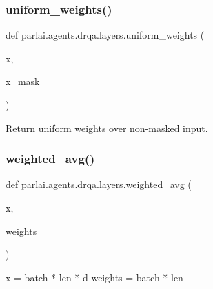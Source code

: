 \subsubsection{\texorpdfstring{uniform\+\_\+weights()}{uniform\_weights()}}
{\footnotesize\ttfamily def parlai.\+agents.\+drqa.\+layers.\+uniform\+\_\+weights (\begin{DoxyParamCaption}\item[{}]{x,  }\item[{}]{x\+\_\+mask }\end{DoxyParamCaption})}

\begin{DoxyVerb}Return uniform weights over non-masked input.
\end{DoxyVerb}
 \mbox{\label{namespaceparlai_1_1agents_1_1drqa_1_1layers_a8d0e781e00db1c2d843b21a056554f65}} 
\subsubsection{\texorpdfstring{weighted\+\_\+avg()}{weighted\_avg()}}
{\footnotesize\ttfamily def parlai.\+agents.\+drqa.\+layers.\+weighted\+\_\+avg (\begin{DoxyParamCaption}\item[{}]{x,  }\item[{}]{weights }\end{DoxyParamCaption})}

\begin{DoxyVerb}x = batch * len * d
weights = batch * len
\end{DoxyVerb}
 